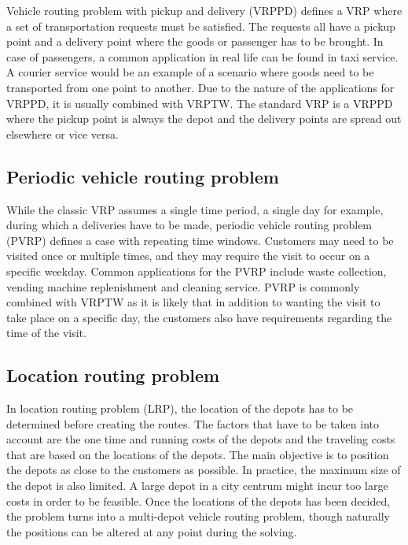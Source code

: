 Vehicle routing problem with pickup and delivery (VRPPD) defines a VRP where a set of transportation requests must be satisfied. The requests all have a pickup point and a delivery point where the goods or passenger has to be brought. In case of passengers, a common application in real life can be found in taxi service. A courier service would be an example of a scenario where goods need to be transported from one point to another. Due to the nature of the applications for VRPPD, it is usually combined with VRPTW. The standard VRP is a VRPPD where the pickup point is always the depot and the delivery points are spread out elsewhere or vice versa. \cite{desaulniers2000vrp}


\subsection{Periodic vehicle routing problem}

While the classic VRP assumes a single time period, a single day for example, during which a deliveries have to be made, periodic vehicle routing problem (PVRP) defines a case with repeating time windows. Customers may need to be visited once or multiple times, and they may require the visit to occur on a specific weekday. \cite{blakeley2003optimizing} Common applications for the PVRP include waste collection, vending machine replenishment and cleaning service. PVRP is commonly combined with VRPTW as it is likely that in addition to wanting the visit to take place on a specific day, the customers also have requirements regarding the time of the visit. \cite{yu2011ant}


\subsection{Location routing problem}

In location routing problem (LRP), the location of the depots has to be determined before creating the routes. The factors that have to be taken into account are the one time and running costs of the depots and the traveling costs that are based on the locations of the depots. The main objective is to position the depots as close to the customers as possible. In practice, the maximum size of the depot is also limited. A large depot in a city centrum might incur too large costs in order to be feasible. Once the locations of the depots has been decided, the problem turns into a multi-depot vehicle routing problem, though naturally the positions can be altered at any point during the solving. \cite{tuzun1999two}



